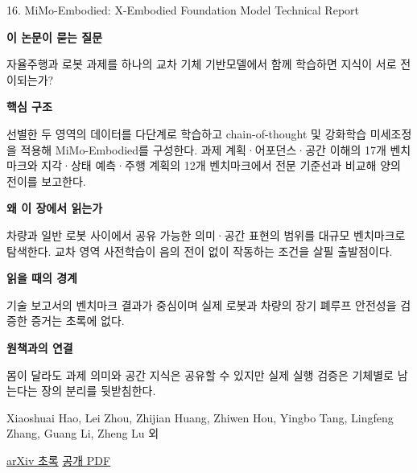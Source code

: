 \documentclass[11pt,openany]{book}
\begin{document}
\begin{termcard}{16. MiMo-Embodied: X-Embodied Foundation Model Technical Report}

\par

\medskip

{\sffamily\bfseries\color{deepblue} 이 논문이 묻는 질문}\par

자율주행과 로봇 과제를 하나의 교차 기체 기반모델에서 함께 학습하면 지식이 서로 전이되는가?

\smallskip

{\sffamily\bfseries\color{deepblue} 핵심 구조}\par

선별한 두 영역의 데이터를 다단계로 학습하고 chain-of-thought 및 강화학습 미세조정을 적용해 MiMo-Embodied를 구성한다. 과제 계획·어포던스·공간 이해의 17개 벤치마크와 지각·상태 예측·주행 계획의 12개 벤치마크에서 전문 기준선과 비교해 양의 전이를 보고한다.

\smallskip

{\sffamily\bfseries\color{deepblue} 왜 이 장에서 읽는가}\par

차량과 일반 로봇 사이에서 공유 가능한 의미·공간 표현의 범위를 대규모 벤치마크로 탐색한다. 교차 영역 사전학습이 음의 전이 없이 작동하는 조건을 살필 출발점이다.

\smallskip

{\sffamily\bfseries\color{coral} 읽을 때의 경계}\par

기술 보고서의 벤치마크 결과가 중심이며 실제 로봇과 차량의 장기 폐루프 안전성을 검증한 증거는 초록에 없다.

\smallskip

{\sffamily\bfseries\color{teal} 원책과의 연결}\par

몸이 달라도 과제 의미와 공간 지식은 공유할 수 있지만 실제 실행 검증은 기체별로 남는다는 장의 분리를 뒷받침한다.

\medskip

{\footnotesize\color{muted} Xiaoshuai Hao, Lei Zhou, Zhijian Huang, Zhiwen Hou, Yingbo Tang, Lingfeng Zhang, Guang Li, Zheng Lu 외\par

\href{https://arxiv.org/abs/2511.16518}{arXiv 초록} \quad \href{https://arxiv.org/pdf/2511.16518}{공개 PDF}\par}

\end{termcard}
\end{document}
